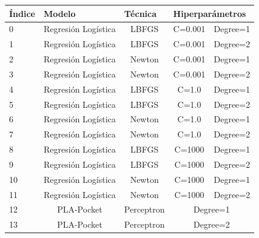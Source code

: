 \documentclass[a4paper,11pt]{article}
\begin{document}
\begin{table}[h]
\begin{tabular}{|l|c|c|c|c|}
\hline
Índice & \multicolumn{1}{l|}{Modelo}              & \multicolumn{1}{l|}{Técnica} & \multicolumn{2}{l|}{Hiperparámetros} \\ \hline
0      & \multicolumn{1}{l|}{Regresión Logística} & LBFGS                        & C=0.001          & Degree=1          \\ \hline
1      & Regresión Logística                      & LBFGS                        & C=0.001          & Degree=2          \\ \hline
2      & Regresión Logística                      & Newton                       & C=0.001          & Degree=1          \\ \hline
3      & Regresión Logística                      & Newton                       & C=0.001          & Degree=2          \\ \hline
4      & Regresión Logística                      & LBFGS                        & C=1.0            & Degree=1          \\ \hline
5      & Regresión Logística                      & LBFGS                        & C=1.0            & Degree=2          \\ \hline
6      & Regresión Logística                      & Newton                       & C=1.0            & Degree=1          \\ \hline
7      & Regresión Logística                      & Newton                       & C=1.0            & Degree=2          \\ \hline
8      & Regresión Logística                      & LBFGS                        & C=1000           & Degree=1          \\ \hline
9      & Regresión Logística                      & LBFGS                        & C=1000           & Degree=2          \\ \hline
10     & Regresión Logística                      & Newton                       & C=1000           & Degree=1          \\ \hline
11     & Regresión Logística                      & Newton                       & C=1000           & Degree=2          \\ \hline
12     & PLA-Pocket                               & Perceptron                   & \multicolumn{2}{c|}{Degree=1}        \\ \hline
13     & PLA-Pocket                               & Perceptron                   & \multicolumn{2}{c|}{Degree=2}        \\ \hline
\end{tabular}
\end{table}
\end{document}
